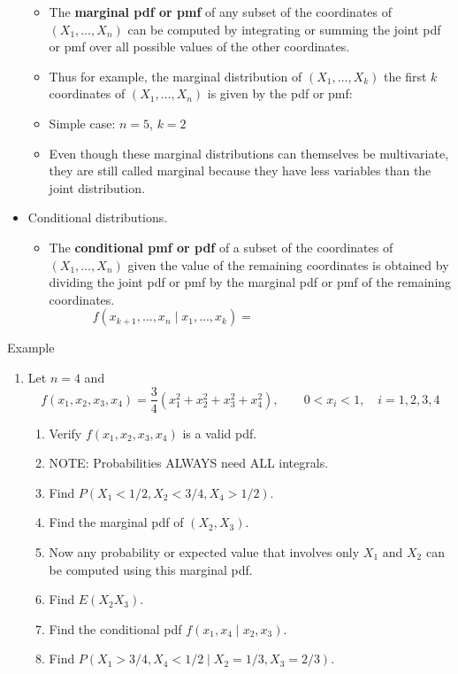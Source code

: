 \documentclass{article}
\newcommand{\vecn}[2]{#1_1, \ldots, #1_{#2}}	%
\begin{document}
\begin{itemize}
\begin{itemize}
        \item The \textbf{marginal pdf or pmf} of any subset of the coordinates of $(\vecn{X}{n})$ can be computed by integrating or summing the joint pdf or pmf over all possible values of the other coordinates.
        \item Thus for example, the marginal distribution of $(\vecn{X}{k})$ the first $k$ coordinates of $(\vecn{X}{n})$ is given by the pdf or pmf:
        \item[] Simple case: $n = 5$, $k = 2$\vspace{40pt}
        \item Even though these marginal distributions can themselves be multivariate, they are still called marginal because they have less variables than the joint distribution.
    \end{itemize}
    \item Conditional distributions.
    \begin{itemize}
        \item The \textbf{conditional pmf or pdf} of a subset of the coordinates of $(\vecn{X}{n})$ given the value of the remaining coordinates is obtained by dividing the joint pdf or pmf by the marginal pdf or pmf of the remaining coordinates.
\[f(x_{k+1}, \dots, x_n \mid \vecn{x}{k}) = \hspace{150pt}\]
    \end{itemize}
\end{itemize}\bigskip

Example\bigskip
\begin{enumerate}
    \item Let $n = 4$ and
    \[f(x_1, x_2, x_3, x_4) = \frac{3}{4}(x_1^2+x_2^2+x_3^2+x_4^2), \quad\quad 0 < x_i < 1,\quad i = 1 ,2 ,3 ,4\]
    \begin{enumerate}
        \item Verify $f(x_1,x_2,x_3,x_4)$ is a valid pdf.\vspace{30pt}
        \item NOTE: Probabilities ALWAYS need ALL integrals.
        \item[] Find $P(X_1 < 1/2, X_2 < 3/4, X_4 > 1/2)$.
        \item Find the marginal pdf of $(X_2,X_3)$.\vspace{80pt}
        \item[] Now any probability or expected value that involves only $X_1$ and $X_2$ can be computed using this marginal pdf.\bigskip
        \item Find $E(X_2 X_3)$.\vspace{80pt}
        \item Find the conditional pdf $f(x_1, x_4 \mid x_2, x_3)$.\vspace{80pt}
        \item Find $P(X_1 > 3/4, X_4 < 1/2 \mid X_2 = 1/3, X_3 = 2/3)$.\vspace{120pt}
    \end{enumerate}
\end{enumerate}\bigskip
\end{document}
